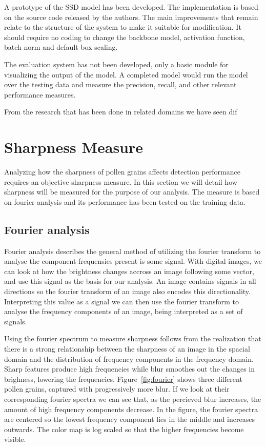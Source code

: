 A prototype of the SSD model has been developed.
The implementation is based on the source code released by the authors.
The main improvements that remain relate to the structure of the system to make it suitable for modification.
It should require no coding to change the backbone model, activation function, batch norm and default box scaling.

The evaluation system has not been developed, only a basic module for visualizing the output of the model.
A completed model would run the model over the testing data and measure the precision, recall, and other relevant performance measures.

From the research that has been done in related domains we have seen dif

\section{Sharpness Measure}\label{sec:method-sharpness}
Analyzing how the sharpness of pollen grains affects detection performance requires an objective sharpness measure.
In this section we will detail how sharpness will be measured for the purpose of our analysis.
The measure is based on fourier analysis and its performance has been tested on the training data.

\subsection{Fourier analysis}
Fourier analysis describes the general method of utilizing the fourier transform to analyse the component frequensies present is some signal.
With digital images, we can look at how the brightness changes accross an image following some vector, and use this signal as the basis for our analysis.
An image contains signals in all directions so the fourier transform of an image also encodes this directionality.
Interpreting this value as a signal we can then use the fourier transform to analyse the frequency components of an image, being interpreted as a set of signals.

Using the fourier spectrum to measure sharpness follows from the realization that there is a strong relationship between the sharpness of an image in the spacial domain and the distribution of frequency components in the frequency domain.
Sharp features produce high frequencies while blur smoothes out the changes in brighness, lowering the frequencies.
Figure~\ref{fig:fourier} shows three different pollen grains, captured with progressively more blur.
If we look at their corresponding fourier spectra we can see that, as the percieved blur increases, the amount of high frequency components decrease.
In the figure, the fourier spectra are centered so the lowest frequency component lies in the middle and increases outwards.
The color map is log scaled so that the higher frequencies become visible.

